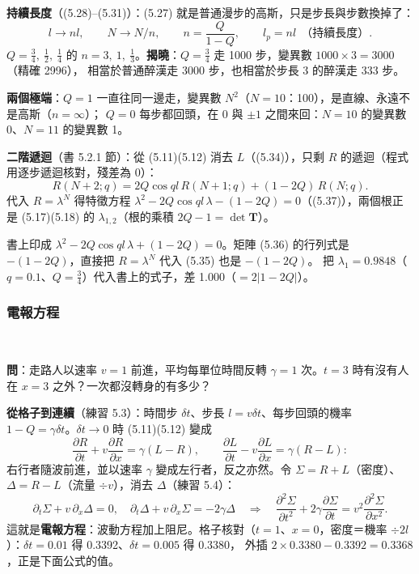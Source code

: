 \textbf{持續長度}（(5.28)--(5.31)）：(5.27) 就是普通漫步的高斯，只是步長與步數換掉了：
\[l\to nl,\qquad N\to N/n,\qquad n=\frac{Q}{1-Q},\qquad l_p=nl\ \ \text{（持續長度）}.\tag{5.28--5.30}\]
$Q=\frac34,\ \frac12,\ \frac14$ 的 $n=3,\ 1,\ \frac13$。\textbf{揭曉}：$Q=\frac34$ 走 1000 步，變異數 $1000\times3=3000$（精確 2996），
相當於普通醉漢走 3000 步，也相當於步長 3 的醉漢走 333 步。

\textbf{兩個極端}：$Q=1$ 一直往同一邊走，變異數 $N^2$（$N=10$：100），是直線、永遠不是高斯（$n=\infty$）；
$Q=0$ 每步都回頭，在 0 與 $\pm1$ 之間來回：$N=10$ 的變異數 0、$N=11$ 的變異數 1。

\textbf{二階遞迴}（書 5.2.1 節）：從 (5.11)(5.12) 消去 $L$（(5.34)），只剩 $R$ 的遞迴（程式用逐步遞迴核對，殘差為 0）：
\[R(N+2;q)=2Q\cos ql\,R(N+1;q)+(1-2Q)\,R(N;q).\tag{5.35}\]
代入 $R=\lambda^N$ 得特徵方程 $\lambda^2-2Q\cos ql\,\lambda-(1-2Q)=0$（(5.37)），兩個根正是 (5.17)(5.18) 的 $\lambda_{1,2}$（根的乘積 $2Q-1=\det\mathbf T$）。
\begin{errbox}[p.~103，(5.37)]
書上印成 $\lambda^2-2Q\cos ql\,\lambda+(1-2Q)=0$。矩陣 (5.36) 的行列式是 $-(1-2Q)$，直接把 $R=\lambda^N$ 代入 (5.35) 也是 $-(1-2Q)$。
把 $\lambda_1=0.9848$（$q=0.1$、$Q=\frac34$）代入書上的式子，差 1.000（$=2|1-2Q|$）。
\end{errbox}

\subsubsection{電報方程}
\leavevmode{}\ \par\nopagebreak

\textbf{問}：走路人以速率 $v=1$ 前進，平均每單位時間反轉 $\gamma=1$ 次。$t=3$ 時有沒有人在 $x=3$ 之外？一次都沒轉身的有多少？

\textbf{從格子到連續}（練習 5.3）：時間步 $\delta t$、步長 $l=v\delta t$、每步回頭的機率 $1-Q=\gamma\delta t$。$\delta t\to0$ 時 (5.11)(5.12) 變成
\[\frac{\partial R}{\partial t}+v\frac{\partial R}{\partial x}=\gamma(L-R),\qquad \frac{\partial L}{\partial t}-v\frac{\partial L}{\partial x}=\gamma(R-L):\tag{5.43, 5.44}\]
右行者隨波前進，並以速率 $\gamma$ 變成左行者，反之亦然。令 $\Sigma=R+L$（密度）、$\Delta=R-L$（流量 $\div v$），消去 $\Delta$（練習 5.4）：
\[\partial_t\Sigma+v\,\partial_x\Delta=0,\quad \partial_t\Delta+v\,\partial_x\Sigma=-2\gamma\Delta\quad\Longrightarrow\quad
\frac{\partial^2\Sigma}{\partial t^2}+2\gamma\frac{\partial\Sigma}{\partial t}=v^2\frac{\partial^2\Sigma}{\partial x^2}.\tag{5.45--5.48}\]
這就是\textbf{電報方程}：波動方程加上阻尼。格子核對（$t=1$、$x=0$，密度＝機率 $\div2l$）：$\delta t=0.01$ 得 0.3392、$\delta t=0.005$ 得 0.3380，
外插 $2\times0.3380-0.3392=0.3368$，正是下面公式的值。

